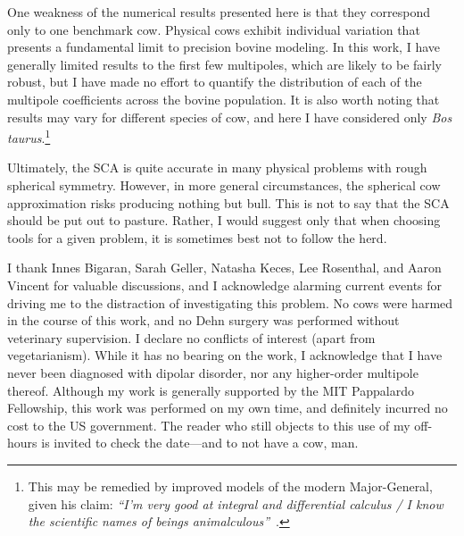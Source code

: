 \documentclass[
    prd, twocolumn, nofootinbib, amsmath, amssymb,
    aps, floatfix, preprintnumbers
]{revtex4-2}
\begin{document}
One weakness of the numerical results presented here is that they correspond only to one benchmark cow. Physical cows exhibit individual variation that presents a fundamental limit to precision bovine modeling. In this work, I have generally limited results to the first few multipoles, which are likely to be fairly robust, but I have made no effort to quantify the distribution of each of the multipole coefficients across the bovine population. It is also worth noting that results may vary for different species of cow, and here I have considered only \textit{Bos taurus}.\footnote{This may be remedied by improved models of the modern Major-General, given his claim: \textit{``I'm very good at integral and differential calculus / I know the scientific names of beings animalculous''}~\cite{bradley}.}

Ultimately, the SCA is quite accurate in many physical problems with rough spherical symmetry. However, in more general circumstances, the spherical cow approximation risks producing nothing but bull. This is not to say that the SCA should be put out to pasture. Rather, I would suggest only that when choosing tools for a given problem, it is sometimes best not to follow the herd.


\begin{acknowledgments}
I thank Innes Bigaran, Sarah Geller, Natasha Keces, Lee Rosenthal, and Aaron Vincent for valuable discussions, and I acknowledge alarming current events for driving me to the distraction of investigating this problem. No cows were harmed in the course of this work, and no Dehn surgery was performed without veterinary supervision. I declare no conflicts of interest (apart from vegetarianism). While it has no bearing on the work, I acknowledge that I have never been diagnosed with dipolar disorder, nor any higher-order multipole thereof. Although my work is generally supported by the MIT Pappalardo Fellowship, this work was performed on my own time, and definitely incurred no cost to the US government. The reader who still objects to this use of my off-hours is invited to check the date---and to not have a cow, man.
\end{acknowledgments}

  
\end{document}
